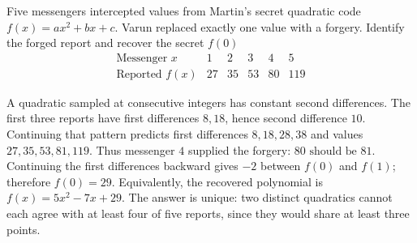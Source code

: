 Five messengers intercepted values from Martin's secret quadratic code $f(x)=ax^2+bx+c$. Varun replaced exactly one value with a forgery. Identify the forged report and recover the secret $f(0)$
\[
\begin{array}{c|ccccc}
\text{Messenger }x&1&2&3&4&5\\ \hline
\text{Reported }f(x)&27&35&53&80&119
\end{array}
\]

\begin{solution}
A quadratic sampled at consecutive integers has constant second differences.
The first three reports have first differences $8,18$, hence second
difference $10$. Continuing that pattern predicts first differences
$8,18,28,38$ and values $27,35,53,81,119$.
Thus messenger $4$ supplied the forgery: $\boxed{80\text{ should be }81}$.
Continuing the first differences backward gives $-2$ between $f(0)$ and
$f(1)$; therefore $\boxed{f(0)=29}$.
Equivalently, the recovered polynomial is $f(x)=5x^2-7x+29$.
The answer is unique: two distinct quadratics cannot each agree with
at least four of five reports, since they would share at least three points.
\end{solution}
